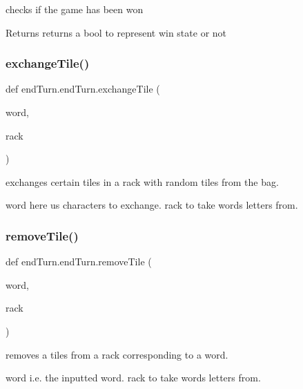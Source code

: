 checks if the game has been won 

\begin{DoxyReturn}{Returns}
returns a bool to represent win state or not 
\end{DoxyReturn}
\mbox{\label{classend_turn_1_1end_turn_ae7a71a01d8013087c36c72c438b93b67}} 
\subsubsection{\texorpdfstring{exchange\+Tile()}{exchangeTile()}}
{\footnotesize\ttfamily def end\+Turn.\+end\+Turn.\+exchange\+Tile (\begin{DoxyParamCaption}\item[{}]{word,  }\item[{}]{rack }\end{DoxyParamCaption})}



exchanges certain tiles in a rack with random tiles from the bag. 

word here us characters to exchange.  rack to take words letters from. \mbox{\label{classend_turn_1_1end_turn_a05d19f3d8632fb2f6c85f757845a8579}} 
\subsubsection{\texorpdfstring{remove\+Tile()}{removeTile()}}
{\footnotesize\ttfamily def end\+Turn.\+end\+Turn.\+remove\+Tile (\begin{DoxyParamCaption}\item[{}]{word,  }\item[{}]{rack }\end{DoxyParamCaption})}



removes a tiles from a rack corresponding to a word. 

word i.\+e. the inputted word.  rack to take words letters from. \mbox{\label{classend_turn_1_1end_turn_a997ab21240dd3b52b2c9f19d5c3beb30}} 
